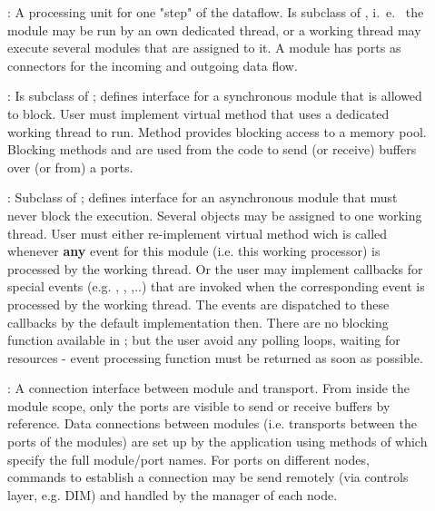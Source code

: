 \begin{description}
\item[] :  
A processing unit for one "step" of the dataflow. 
   Is subclass of , i.~e.~ the module may be run by an own 
   dedicated thread, or a working thread may execute several modules that 
   are assigned to it. A module has ports as connectors for the 
   incoming and outgoing data flow.   

\item[] : 
Is subclass of ; defines interface for a 
   synchronous module that is allowed to block. User must implement virtual 
   method  that uses a dedicated working thread to run. 
   Method  provides blocking access to a memory pool. 
   Blocking methods  and
     are used from the  
    code to send (or receive) buffers over (or from) a ports.  

\item[] : 
Subclass of ; defines interface for an 
   asynchronous module that must never block the execution. Several 
    objects may be assigned to one working thread. User must 
   either re-implement virtual method  wich is called 
   whenever {\bf any} event for this module (i.e. this working processor) 
   is processed by the working thread. Or the user may implement 
   callbacks for special events (e.g. , 
   , ,..) that are invoked when 
   the corresponding event is processed by the working thread. 
   The events are dispatched to these callbacks by the  
   default implementation then. There are no blocking function available in ;  
   but the user  avoid any polling loops, waiting for resources - 
   event processing function must be returned as soon as possible.

\item[] : 
A connection interface between module and transport. 
   From inside the module scope, only the ports are visible to send or  receive 
   buffers by reference. Data connections between modules 
   (i.e. transports between the ports of the modules) are set up by 
   the application using methods of  which specify the full 
   module/port names. For ports on different nodes, commands to establish 
   a connection may be send remotely (via controls layer, e.g. DIM) and 
   handled by the manager of each node.  


\end{description}
